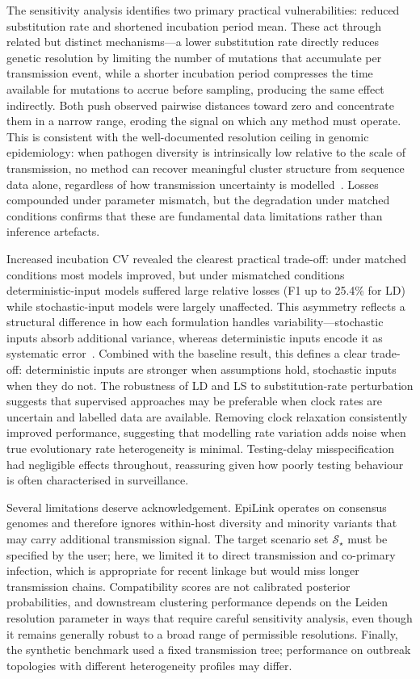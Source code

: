\documentclass[10pt,letterpaper]{article}
\begin{document}
The sensitivity analysis identifies two primary practical vulnerabilities: reduced substitution rate and shortened incubation period mean. These act through related but distinct mechanisms---a lower substitution rate directly reduces genetic resolution by limiting the number of mutations that accumulate per transmission event, while a shorter incubation period compresses the time available for mutations to accrue before sampling, producing the same effect indirectly. Both push observed pairwise distances toward zero and concentrate them in a narrow range, eroding the signal on which any method must operate. This is consistent with the well-documented resolution ceiling in genomic epidemiology: when pathogen diversity is intrinsically low relative to the scale of transmission, no method can recover meaningful cluster structure from sequence data alone, regardless of how transmission uncertainty is modelled~\cite{Louca2021, Farjo2023, Bendall2022}. Losses compounded under parameter mismatch, but the degradation under matched conditions confirms that these are fundamental data limitations rather than inference artefacts.

Increased incubation CV revealed the clearest practical trade-off: under matched conditions most models improved, but under mismatched conditions deterministic-input models suffered large relative losses (F1 up to 25.4\% for LD) while stochastic-input models were largely unaffected. This asymmetry reflects a structural difference in how each formulation handles variability---stochastic inputs absorb additional variance, whereas deterministic inputs encode it as systematic error~\cite{Campbell2018a, VillabonaArenas2020, Duchene2020, Suster2022}. Combined with the baseline result, this defines a clear trade-off: deterministic inputs are stronger when assumptions hold, stochastic inputs when they do not. The robustness of LD and LS to substitution-rate perturbation suggests that supervised approaches may be preferable when clock rates are uncertain and labelled data are available. Removing clock relaxation consistently improved performance, suggesting that modelling rate variation adds noise when true evolutionary rate heterogeneity is minimal. Testing-delay misspecification had negligible effects throughout, reassuring given how poorly testing behaviour is often characterised in surveillance.

Several limitations deserve acknowledgement. EpiLink operates on consensus genomes and therefore ignores within-host diversity and minority variants that may carry additional transmission signal. The target scenario set $\mathcal{S}_\star$ must be specified by the user; here, we limited it to direct transmission and co-primary infection, which is appropriate for recent linkage but would miss longer transmission chains. Compatibility scores are not calibrated posterior probabilities, and downstream clustering performance depends on the Leiden resolution parameter in ways that require careful sensitivity analysis, even though it remains generally robust to a broad range of permissible resolutions. Finally, the synthetic benchmark used a fixed transmission tree; performance on outbreak topologies with different heterogeneity profiles may differ.
\end{document}
